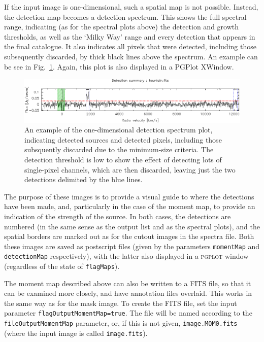 If the input image is one-dimensional, such a spatial map is not
possible. Instead, the detection map becomes a detection
spectrum. This shows the full spectral range, indicating (as for the
spectral plots above) the detection and growth thresholds, as well as
the `Milky Way' range and every detection that appears in the final
catalogue. It also indicates all pixels that were detected, including
those subsequently discarded, by thick black lines above the
spectrum. An example can be see in
Fig.~\ref{fig-1D-detection-spectrum}. Again, this plot is also
displayed in a PGPlot XWindow.

\begin{figure}[!t]
  \begin{center}
    \includegraphics[width=\textwidth]{example_detection_spectrum}
  \end{center}
  \caption{\footnotesize An example of the one-dimensional detection
    spectrum plot, indicating detected sources and detected pixels,
    including those subsquently discarded due to the minimum-size
    criteria. The detection threshold is low to show the effect of
    detecting lots of single-pixel channels, which are then discarded,
    leaving just the two detections delimited by the blue lines.}
  \label{fig-1D-detection-spectrum}
\end{figure}



The purpose of these images is to provide a visual guide to where the
detections have been made, and, particularly in the case of the moment
map, to provide an indication of the strength of the source. In both
cases, the detections are numbered (in the same sense as the output
list and as the spectral plots), and the spatial borders are marked
out as for the cutout images in the spectra file. Both these images
are saved as postscript files (given by the parameters
\texttt{momentMap} and \texttt{detectionMap} respectively), with the
latter also displayed in a \textsc{pgplot} window (regardless of the
state of \texttt{flagMaps}).


\label{sec-momentOut}

The moment map described above can also be written to a FITS file, so
that it can be examined more closely, and have annotation files
overlaid. This works in the same way as for the mask image. To create
the FITS file, set the input parameter
\texttt{flagOutputMomentMap=true}. The file will be named according to
the \texttt{fileOutputMomentMap} parameter, or, if this is not given,
\texttt{image.MOM0.fits} (where the input image is called
\texttt{image.fits}).

